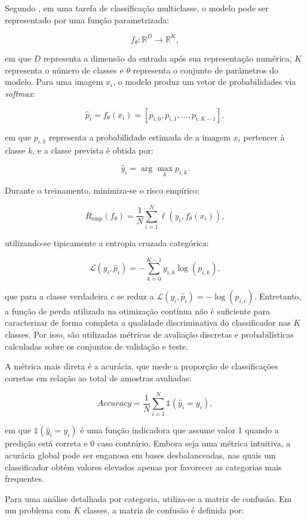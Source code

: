 \documentclass[
    12pt,
    openright,
    oneside,
    a4paper,
    english,
    brazil
]{abntex2}
\begin{document}
Segundo , em uma tarefa de classificação multiclasse, o modelo pode ser representado por uma função parametrizada:

\[
f_{\theta}: \mathbb{R}^{D} \rightarrow \mathbb{R}^{K},
\]

em que \(D\) representa a dimensão da entrada após sua representação numérica, \(K\) representa o número de classes e \(\theta\) representa o conjunto de parâmetros do modelo. Para uma imagem \(x_i\), o modelo produz um vetor de probabilidades via \textit{softmax}:

\[
\hat{p}_i = f_{\theta}(x_i) = [p_{i,0}, p_{i,1}, \ldots, p_{i,K-1}],
\]

em que \(p_{i,k}\) representa a probabilidade estimada de a imagem \(x_i\) pertencer à classe \(k\), e a classe prevista é obtida por:

\[
\hat{y}_i = \arg\max_{k} p_{i,k}.
\]

Durante o treinamento, minimiza-se o risco empírico:

\[
R_{\text{emp}}(f_{\theta}) =
\frac{1}{N}
\sum_{i=1}^{N}
\ell(y_i, f_{\theta}(x_i)),
\]

utilizando-se tipicamente a entropia cruzada categórica:

\[
\mathcal{L}(y_i, \hat{p}_i) =
-\sum_{k=0}^{K-1} y_{i,k}\log(p_{i,k}),
\]

que para a classe verdadeira \(c\) se reduz a \(\mathcal{L}(y_i, \hat{p}_i) = -\log(p_{i,c})\). Entretanto, a função de perda utilizada na otimização contínua não é suficiente para caracterizar de forma completa a qualidade discriminativa do classificador nas \(K\) classes. Por isso, são utilizadas métricas de avaliação discretas e probabilísticas calculadas sobre os conjuntos de validação e teste.

A métrica mais direta é a acurácia, que mede a proporção de classificações corretas em relação ao total de amostras avaliadas:

\[
Accuracy =
\frac{1}{N}
\sum_{i=1}^{N}
\mathbb{1}(\hat{y}_i = y_i),
\]

em que \(\mathbb{1}(\hat{y}_i = y_i)\) é uma função indicadora que assume valor 1 quando a predição está correta e 0 caso contrário. Embora seja uma métrica intuitiva, a acurácia global pode ser enganosa em bases desbalanceadas, nas quais um classificador obtém valores elevados apenas por favorecer as categorias mais frequentes.

Para uma análise detalhada por categoria, utiliza-se a matriz de confusão. Em um problema com \(K\) classes, a matriz de confusão é definida por:
\end{document}
